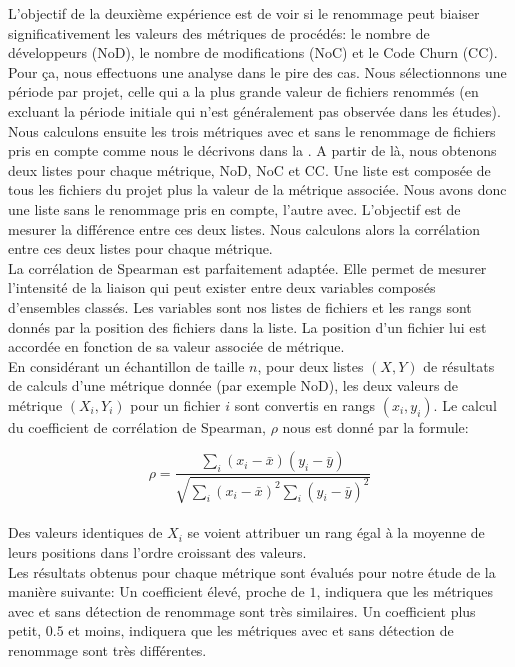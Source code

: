 L'objectif de la deuxième expérience est de voir si le renommage peut biaiser significativement les valeurs des métriques de procédés: le nombre de développeurs (NoD), le nombre de modifications (NoC) et le Code Churn (CC). Pour ça, nous effectuons une analyse dans le pire des cas. Nous sélectionnons une période par projet, celle qui a la plus grande valeur de fichiers renommés (en excluant la période initiale qui n'est généralement pas observée dans les études).\\ 

Nous calculons ensuite les trois métriques avec et sans le renommage de fichiers pris en compte comme nous le décrivons dans la . A partir de là, nous obtenons deux listes pour chaque métrique, NoD, NoC et CC. Une liste est composée de tous les fichiers du projet plus la valeur de la métrique associée. Nous avons donc une liste sans le renommage pris en compte, l'autre avec. L'objectif est de mesurer la différence entre ces deux listes. Nous calculons alors la corrélation entre ces deux listes pour chaque métrique.\\ 


La corrélation de Spearman est parfaitement adaptée. Elle permet de mesurer l'intensité de la liaison qui peut exister entre deux variables composés d'ensembles classés. Les variables sont nos listes de fichiers et les rangs sont donnés par la position des fichiers dans la liste. La position d'un fichier lui est accordée en fonction de sa valeur associée de métrique.\\ 

En considérant un échantillon de taille $n$, pour deux listes $(X, Y)$ de résultats de calculs d'une métrique donnée (par exemple NoD), les deux valeurs de métrique $(X_{i}, Y_{i})$ pour un fichier $i$ sont convertis en rangs $(x_{i}, y_{i})$. Le calcul du coefficient de corrélation de Spearman, $\rho$  nous est donné par la formule: 

\[ \rho = \frac{\sum_{i}(x_{i} - \bar{x})(y_{i} - \bar{y})}{ \sqrt{ \sum_{i}(x_{i} - \bar{x})^2\sum_{i}(y_{i} - \bar{y})^2 } } \]\\

Des valeurs identiques de $X_i$ se voient attribuer un rang égal à la moyenne de leurs positions dans l'ordre croissant des valeurs.\\

Les résultats obtenus pour chaque métrique sont évalués pour notre étude de la manière suivante: Un coefficient élevé, proche de $1$, indiquera que les métriques avec et sans détection de renommage sont très similaires. Un coefficient plus petit, $0.5$ et moins, indiquera que les métriques avec et sans détection de renommage sont très différentes.\\  

